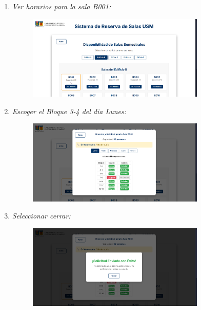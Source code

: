\documentclass{article}
\begin{document}
\begin{enumerate}
\begin{enumerate}
            \item \textit{Ver horarios para la sala B001:}
            \begin{figure}[H] 
                \centering 
                \includegraphics[width=0.8\textwidth]{IMG/ss4.png} 
            \end{figure}

            \newpage
            \item \textit{Escoger el Bloque 3-4 del dia Lunes: }
            \begin{figure}[H] 
                \centering 
                \includegraphics[width=0.8\textwidth]{IMG/ss5.png} 
            \end{figure}

            \item  \textit{Seleccionar cerrar:}
            \begin{figure}[H] 
                \centering 
                \includegraphics[width=0.8\textwidth]{IMG/ss6.png} 
            \end{figure}


\end{enumerate}
\end{enumerate}
\end{document}
